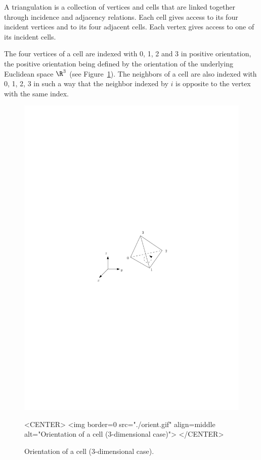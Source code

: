 A triangulation is a collection of vertices and cells that are linked
together through incidence and adjacency relations. Each cell gives
access to its four incident vertices and to its four adjacent
cells. Each vertex gives access to one of its incident cells.

The four vertices of a cell are indexed with 0, 1, 2 and 3 in positive
orientation, the positive orientation being defined by the orientation
of the underlying Euclidean space $\R^3$ (see
Figure~\ref{Triangulation3-fig-orient}). The neighbors of a cell are also
indexed with 0, 1, 2, 3 in such a way that the neighbor indexed by $i$
is opposite to the vertex with the same index. 

\begin{figure}[htbp]
\begin{ccTexOnly}
\begin{center} 
\includegraphics{Triangulation_3/orient} 
\end{center}
\end{ccTexOnly}
\begin{ccHtmlOnly}
<CENTER>
<img border=0 src="./orient.gif" align=middle alt="Orientation of a cell 
(3-dimensional case)">
</CENTER>
\end{ccHtmlOnly}
\caption{Orientation of a cell (3-dimensional case).
\label{Triangulation3-fig-orient}}
\end{figure} 

